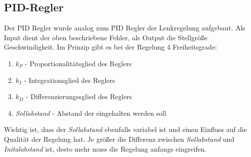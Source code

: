\subsection{PID-Regler}\label{subsec:PID-Regler}
Der PID Regler wurde analog zum PID Regler der Lenkregelung aufgebaut. Als Input
dient der oben beschriebene Fehler, als Output die Stellgröße Geschwindigkeit.
Im Prinzip gibt es bei der Regelung 4 Freiheitsgrade:
\begin{enumerate}
    \item $k_P$ - Proportionalitätsglied des Reglers
    \item $k_I$ - Integrationsglied des Reglers
    \item $k_D$ - Differenzierungssglied des Reglers
    \item \textit{Sollabstand} - Abstand der eingehalten werden soll
\end{enumerate}
Wichtig ist, dass der \textit{Sollabstand} ebenfalls variabel ist und einen
Einfluss auf die Qualität der Regelung hat. Je größer die Differenz zwischen
\textit{Sollabstand} und \textit{Initalabstand} ist, desto mehr muss die
Regelung anfangs eingreifen.


